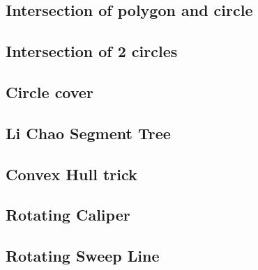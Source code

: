 \documentclass[a4paper,10pt,twocolumn,oneside]{article}
\begin{document}
%

\subsection{Intersection of polygon and circle}


\subsection{Intersection of 2 circles}


\subsection{Circle cover}


%

\subsection{Li Chao Segment Tree}


\subsection{Convex Hull trick}


\subsection{Rotating Caliper}


\subsection{Rotating Sweep Line}

\end{document}
